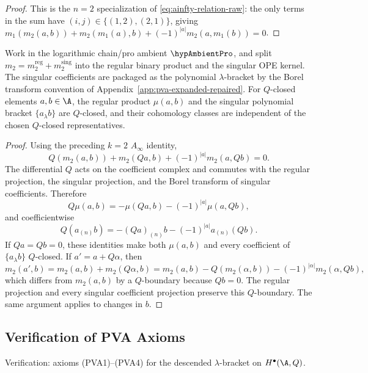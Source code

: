 \begin{proof}
This is the $n=2$ specialization of \eqref{eq:ainfty-relation-raw}: the only terms in the sum have $(i,j)\in\{(1,2),(2,1)\}$, giving $m_1(m_2(a,b)) + m_2(m_1(a),b) + (-1)^{|a|}m_2(a,m_1(b))=0$.
\end{proof}

\begin{lemma}
Work in the logarithmic chain/pro ambient $\hypAmbientPro$, and split
\(m_2=m_2^{\mathrm{reg}}+m_2^{\mathrm{sing}}\) into the regular
binary product and the singular OPE kernel. The singular coefficients
are packaged as the polynomial \(\lambda\)-bracket by the Borel
transform convention of Appendix~\ref{app:pva-expanded-repaired}. For
\(Q\)-closed elements \(a,b\in\A\), the regular product
\(\mu(a,b)\) and the singular polynomial bracket \(\{a_\lambda b\}\)
are \(Q\)-closed, and their cohomology classes are independent of the
chosen \(Q\)-closed representatives.
\end{lemma}

\begin{proof}
Using the preceding \(k=2\) \(A_\infty\) identity,
\[
Q(m_2(a,b)) + m_2(Qa,b) + (-1)^{|a|} m_2(a,Qb)=0.
\]
The differential \(Q\) acts on the coefficient complex and commutes
with the regular projection, the singular projection, and the Borel
transform of singular coefficients. Therefore
\[
Q\mu(a,b)=-\mu(Qa,b)-(-1)^{|a|}\mu(a,Qb),
\]
and coefficientwise
\[
Q(a_{(n)}b)=-(Qa)_{(n)}b-(-1)^{|a|}a_{(n)}(Qb).
\]
If \(Qa=Qb=0\), these identities make both \(\mu(a,b)\) and every
coefficient of \(\{a_\lambda b\}\) \(Q\)-closed. If
\(a'=a+Q\alpha\), then
\[
m_2(a',b) = m_2(a,b) + m_2(Q\alpha,b) = m_2(a,b) - Q(m_2(\alpha,b)) - (-1)^{|\alpha|} m_2(\alpha,Qb),
\]
which differs from \(m_2(a,b)\) by a \(Q\)-boundary because \(Qb=0\).
The regular projection and every singular coefficient projection
preserve this \(Q\)-boundary. The same argument applies to changes in
\(b\).
\end{proof}

\subsection{Verification of PVA Axioms}

Verification: axioms (PVA1)--(PVA4) for the descended $\lambda$-bracket on $H^\bullet(\A,Q)$.

